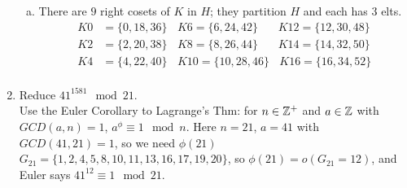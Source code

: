 \begin{enumerate}
\begin{enumerate}[a)]
    \item There are $9$ right cosets of $K$ in $H$; they partition $H$ and each has $3$ elts. 
    \begin{align*}
        K0 &= \{0, 18, 36\} \ \ \ \ K6 = \{6, 24,42\} \ \ \ \ \ \ \ \ K12 = \{12, 30, 48\}   \\
        K2 &= \{2, 20, 38\} \ \ \ \ K8 = \{8, 26, 44\} \ \ \ \ \ \ \ \ K14 = \{14, 32, 50\}  \\
        K4 &= \{4, 22, 40\} \ \ \ \ K10 = \{10, 28, 46\} \ \ \ \ K16 = \{16, 34, 52\}  \\
    \end{align*}
\end{enumerate}
\item Reduce $41^{1581} \mod 21$. \\
Use the Euler Corollary to Lagrange's Thm: for $n\in {\mathbb{ Z}}^+$ and $a\in {\mathbb{ Z}}$ with $GCD(a,n)=1$, $a^{\phi} \equiv 1 \mod n$. Here $n=21$, $a=41$ with $GCD(41,21)=1$, so we need $\phi(21)$ \\
$G_{21}= \{1,2,4,5,8,10,11,13,16,17,19,20\}$, so $\phi(21)=o(G_{21}=12)$, and Euler says $41^{12}\equiv 1 \mod 21$.

\end{enumerate}









